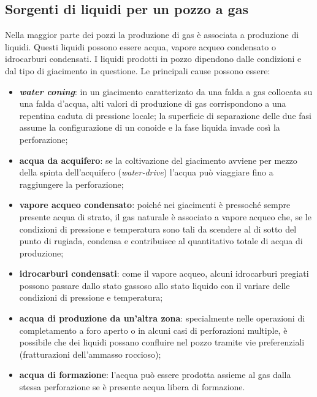 \subsection{Sorgenti di liquidi per un pozzo a gas}
Nella maggior parte dei pozzi la produzione di gas è associata a produzione di liquidi. Questi liquidi possono essere acqua, vapore acqueo condensato o idrocarburi condensati. I liquidi prodotti in pozzo dipendono dalle condizioni e dal tipo di giacimento in questione. Le principali cause possono essere:

\begin{itemize}
    \item \textbf{\textit{water coning}}: in un giacimento caratterizato da una falda a gas collocata su una falda d'acqua, alti valori di produzione di gas corrispondono a una repentina caduta di pressione locale; la superficie di separazione delle due fasi assume la configurazione di un conoide e la fase liquida invade così la perforazione;
    \item \textbf{acqua da acquifero}: se la coltivazione del giacimento avviene per mezzo della spinta dell'acquifero (\textit{water-drive}) l'acqua può viaggiare fino a raggiungere la perforazione;
    \item \textbf{vapore acqueo condensato}: poiché nei giacimenti è pressoché sempre presente acqua di strato, il gas naturale è associato a vapore acqueo che, se le condizioni di pressione e temperatura sono tali da scendere al di sotto del punto di rugiada, condensa e contribuisce al quantitativo totale di acqua di produzione;
    \item \textbf{idrocarburi condensati}: come il vapore acqueo, alcuni idrocarburi pregiati possono passare dallo stato gassoso allo stato liquido con il variare delle condizioni di pressione e temperatura;
    \item \textbf{acqua di produzione da un'altra zona}: specialmente nelle operazioni di completamento a foro aperto o in alcuni casi di perforazioni multiple, è possibile che dei liquidi possano confluire nel pozzo tramite vie preferenziali (fratturazioni dell'ammasso roccioso);
    \item \textbf{acqua di formazione}: l'acqua può essere prodotta assieme al gas dalla stessa perforazione se è presente acqua libera di formazione.
\end{itemize}

